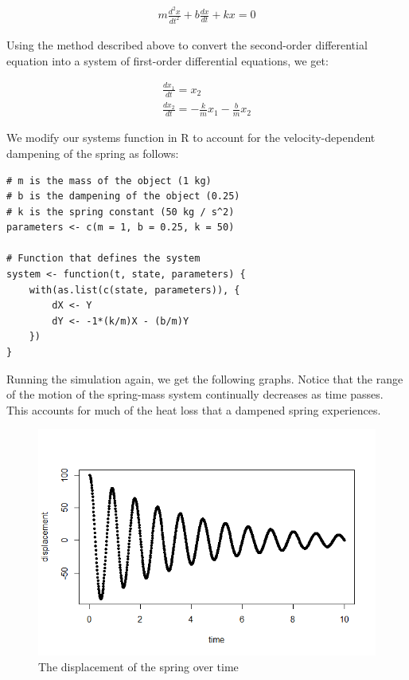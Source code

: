 \begin{gather*}
    m\frac{d^2 x}{dt^2}+b\frac{dx}{dt}+kx=0
\end{gather*}

Using the method described above to convert the second-order differential equation into a system of first-order differential equations, we get:

\begin{gather*}
\frac{dx_1}{dt}=x_2\\
\frac{dx_2}{dt}=-\frac{k}{m}x_1 - \frac{b}{m}x_2
\end{gather*}

We modify our systems function in R to account for the velocity-dependent dampening of the spring as follows:

\begin{lstlisting}
# m is the mass of the object (1 kg)
# b is the dampening of the object (0.25)
# k is the spring constant (50 kg / s^2)
parameters <- c(m = 1, b = 0.25, k = 50)

# Function that defines the system
system <- function(t, state, parameters) {
    with(as.list(c(state, parameters)), {
        dX <- Y
        dY <- -1*(k/m)X - (b/m)Y
    })
}
\end{lstlisting}

Running the simulation again, we get the following graphs.
Notice that the range of the motion of the spring-mass system continually decreases as time passes.
This accounts for much of the heat loss that a dampened spring experiences. 

\begin{figure}[H]
    \centering
    \includegraphics[width=12cm]{pictures/diffeq/plot3.png}
    \caption{The displacement of the spring over time}
\end{figure}

